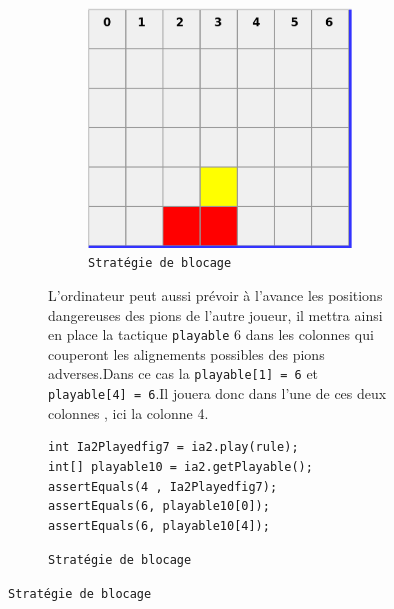 \begin{figure}[H]
\begin{figure}[H]
\begin{figure}[H]
\begin{center}
  \includegraphics[scale=0.2]{playable1}
  \caption{\texttt{Stratégie de blocage}}
\end{center}
\end{figure}
L'ordinateur peut aussi prévoir à l'avance les positions dangereuses des pions de l'autre joueur,
il mettra ainsi en place la tactique \texttt{playable} 6 dans les colonnes qui couperont les alignements 
possibles des pions adverses.Dans ce cas la \texttt{playable[1] = 6} et \texttt{playable[4] = 6}.Il jouera donc dans
l'une de ces deux colonnes , ici la colonne 4.

\begin{verbatim}
int Ia2Playedfig7 = ia2.play(rule);
int[] playable10 = ia2.getPlayable();
assertEquals(4 , Ia2Playedfig7);
assertEquals(6, playable10[0]);
assertEquals(6, playable10[4]);
\end{verbatim}



\end{figure}
\end{figure}
